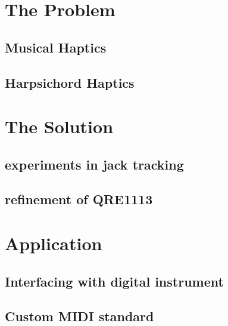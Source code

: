 \section{The Problem}\label{the-problem-3}

\subsection{Musical Haptics}\label{musical-haptics}

\subsection{Harpsichord Haptics}\label{harpsichord-haptics}

\section{The Solution}\label{the-solution-2}

\subsection{experiments in jack
tracking}\label{experiments-in-jack-tracking}

\subsection{refinement of QRE1113}\label{refinement-of-qre1113}

\section{Application}\label{application-2}

\subsection{Interfacing with digital
instrument}\label{interfacing-with-digital-instrument}

\subsection{Custom MIDI standard}\label{custom-midi-standard}


